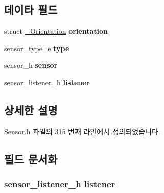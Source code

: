 \subsection*{데이타 필드}
\begin{DoxyCompactItemize}
\item 
\hypertarget{struct___orientation_extend_ad28b7e9f0c184d60aba7731570671894}{struct \hyperlink{struct___orientation}{\-\_\-\-Orientation} {\bfseries orientation}}\label{struct___orientation_extend_ad28b7e9f0c184d60aba7731570671894}

\item 
\hypertarget{struct___orientation_extend_abffb09766da2fc510a79bb51f82a36e1}{sensor\-\_\-type\-\_\-e {\bfseries type}}\label{struct___orientation_extend_abffb09766da2fc510a79bb51f82a36e1}

\item 
\hypertarget{struct___orientation_extend_a5bae9b7801bc3808411925cde81d3f26}{sensor\-\_\-h {\bfseries sensor}}\label{struct___orientation_extend_a5bae9b7801bc3808411925cde81d3f26}

\item 
\hypertarget{struct___orientation_extend_aa977dfb866b24fd7d9a20a9a01b2fd1f}{sensor\-\_\-listener\-\_\-h {\bfseries listener}}\label{struct___orientation_extend_aa977dfb866b24fd7d9a20a9a01b2fd1f}

\end{DoxyCompactItemize}


\subsection{상세한 설명}


Sensor.\-h 파일의 315 번째 라인에서 정의되었습니다.



\subsection{필드 문서화}
\hypertarget{struct___orientation_extend_aa977dfb866b24fd7d9a20a9a01b2fd1f}{
\subsubsection[{listener}]{\setlength{\rightskip}{0pt plus 5cm}sensor\-\_\-listener\-\_\-h listener}}\label{struct___orientation_extend_aa977dfb866b24fd7d9a20a9a01b2fd1f}


